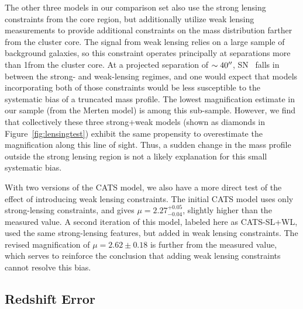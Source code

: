 The other three models in our comparison set also use the strong
lensing constraints from the core region, but additionally utilize weak
lensing measurements to provide additional constraints on the mass
distribution farther from the cluster core.  The signal from weak
lensing relies on a large sample of background galaxies, so this
constraint operates principally at separations more than 1\arcmin from
the cluster core.  At a projected separation of $\sim40^{\prime\prime}$,
SN \tomas\ falls in between the strong- and weak-lensing regimes, and
one would expect that models incorporating both of those constraints
would be less susceptible to the systematic bias of a truncated mass
profile.  The lowest magnification estimate in our sample (from the
Merten model) is among this sub-sample.  However, we find that
collectively these three strong+weak models (shown as diamonds in
Figure~\ref{fig:lensingtest}) exhibit the same propensity to
overestimate the magnification along this line of sight.  Thus, a
sudden change in the mass profile outside the strong lensing region is
not a likely explanation for this small systematic bias.

With two versions of the CATS model, we also have a more direct test
of the effect of introducing weak lensing constraints.  The initial
CATS model uses only strong-lensing constraints, and gives
$\mu=2.27^{+0.05}_{-0.04}$, slightly higher than the measured value.
A second iteration of this model, labeled here as CATS-SL+WL, used the
same strong-lensing features, but added in weak lensing constraints.
The revised magnification of $\mu=2.62\pm0.18$ is further from the
measured value, which serves to reinforce the conclusion that adding
weak lensing constraints cannot resolve this bias.


\subsection{Redshift Error}
\label{sec:RedshiftError}


